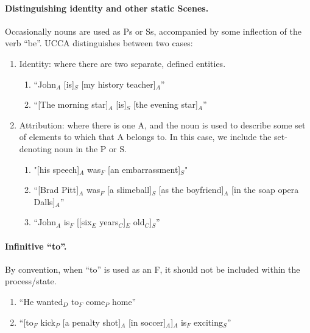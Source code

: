 \documentclass[11pt]{article}
\newcommand{\be}{\begin{enumerate}}
\newcommand{\ee}{\end{enumerate}}
\begin{document}
\paragraph{Distinguishing identity and other static Scenes.}
Occasionally nouns are used as Ps or Ss, accompanied by some inflection of the verb ``be''. UCCA distinguishes between two cases:
\be \item
Identity: where there are two separate, defined entities.
\be \item
``John$_A$ [is]$_S$ [my history teacher]$_A$''
\item
``[The morning star]$_A$ [is]$_S$ [the evening star]$_A$''
\ee

\item
Attribution: where there is one A, and the noun is used to describe some set of elements to which that A belongs to. In this case, we include the set-denoting noun in the P or S.
\be \item
"[his speech]$_A$ was$_F$ [an embarrassment]$_S$"
\item
``[Brad Pitt]$_A$ was$_F$ [a slimeball]$_S$ [as the boyfriend]$_A$ [in the soap opera Dalls]$_A$''
\item
``John$_A$ is$_F$ [[six$_E$ years$_C$]$_E$ old$_C$]$_S$''
\ee
\ee


\paragraph{Infinitive ``to''.} By convention, when ``to'' is used as an F, it should not be included within the process/state.
\be \item
``He wanted$_D$ to$_F$ come$_P$ home''
\item
``[to$_F$ kick$_P$ [a penalty shot]$_A$ [in soccer]$_A$]$_A$ is$_F$ exciting$_S$''
\ee
\end{document}

